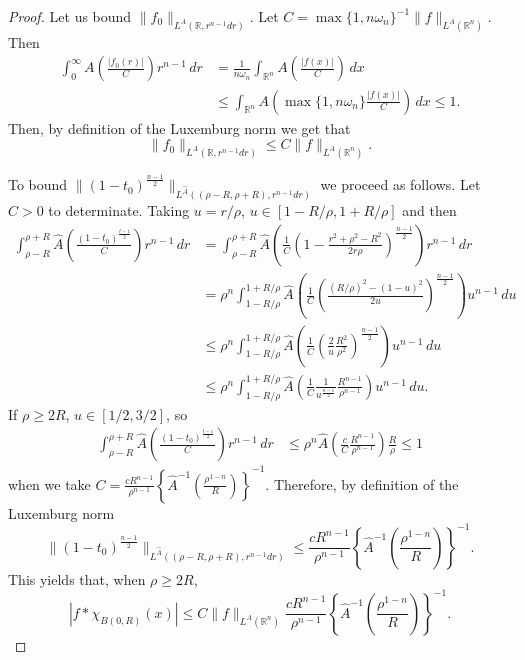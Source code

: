 \documentclass[leqno,twoside, 12pt]{amsart}
\theoremstyle{plain}
\numberwithin{equation}{section} \numberwithin{figure}{section}
\theoremstyle{definition}
\newcommand{\R}{\mathbb R}
\numberwithin{equation}{section}
\begin{document}
\begin{proof}
\noindent Let us bound $\|f_0\|_{L^A(\R, r^{n-1}dr)}$.
Let $C=\max\{1, n\omega_n\}^{-1}\|f\|_{L^A(\R^n)}$. Then
\begin{align*}
\int_0^\infty A\left( \frac{|f_0(r)|}{C} \right)r^{n-1}\,dr &=
\frac{1}{n\omega_n}\int_{\R^n} A\left( \frac{|f(x)|}{C} \right)\,dx\\
&\leq\int_{\R^n}
A\left(\max\{1, n\omega_n\}  \frac{|f(x)|}{C} \right)\,dx \leq 1.
\end{align*}
Then, by definition of the Luxemburg norm we get that
$$
\|f_0\|_{L^A(\R, r^{n-1}dr)}\leq C \|f\|_{L^A(\R^n)}.
$$


\noindent To bound  $\|(1-t_0)^\frac{n-1}{2}\|_{L^{\hat A}((\rho-R,\rho+R), r^{n-1}dr)}$ we proceed as follows. Let $C>0$ to determinate. Taking $u=r/\rho$, $u\in [1-R/\rho,1+R/\rho]$ and then
\begin{align*}
\int_{\rho-R}^{\rho+R}  \hat A\left(\frac{(1-t_0)^{\frac{t-1}{2}}}{C} \right)r^{n-1}\,dr 
&=
\int_{\rho-R}^{\rho+R}  \hat A\left(\frac{1}{C}\left(1-\frac{r^2 +   \rho^2 - R^2}{2r\rho}\right)^{\frac{n-1}{2}} \right)r^{n-1}\,dr\\
&=
\rho^n \int_{1-R/\rho}^{1+R/\rho}  \hat A\left( \frac{1}{C} \left(\frac{(R/\rho)^2 -(1-u)^2}{2u} \right)^\frac{n-1}{2}\right)u^{n-1}\,du\\
&\leq 
\rho^n \int_{1-R/\rho}^{1+R/\rho}  \hat A\left( \frac{1}{C}\left(\frac{2}{u} \frac{R^2}{\rho^2} \right)^\frac{n-1}{2}\right)u^{n-1}\,du\\
&\leq 
\rho^n \int_{1-R/\rho}^{1+R/\rho}  \hat A\left( \frac{1}{C} \frac{1}{u^\frac{n-1}{2}}\frac{R^{n-1}}{\rho^{n-1}} \right)u^{n-1}\,du.
\end{align*}
If $\rho\geq 2R$, $u\in[1/2,3/2]$, so
\begin{align*}
\int_{\rho-R}^{\rho+R}  \hat A\left(\frac{(1-t_0)^{\frac{t-1}{2}}}{C} \right)r^{n-1}\,dr 
&\leq
\rho^n  \hat A\left( \frac{c}{C} \frac{R^{n-1}}{\rho^{n-1}} \right) \frac{R}{\rho}\leq 1
\end{align*}
when we take $C= \frac{cR^{n-1}}{\rho^{n-1}} \left\{\hat A^{-1}\left( \frac{\rho^{1-n}}{R}\right) \right\}^{-1}$. Therefore, by definition of the Luxemburg norm
$$
\|(1-t_0)^\frac{n-1}{2}\|_{L^{\hat A}((\rho-R,\rho+R), r^{n-1}dr)} \leq  \frac{cR^{n-1}}{\rho^{n-1}} \left\{\hat A^{-1}\left( \frac{\rho^{1-n}}{R}\right) \right\}^{-1}.
$$
This yields that, when $\rho\geq 2R$,
\begin{equation} \label{f.1}
|f*\chi_{B(0,R)}(x)|\leq C \|f\|_{L^A(\R^n)}   \frac{cR^{n-1}}{\rho^{n-1}} \left\{\hat A^{-1}\left( \frac{\rho^{1-n}}{R}\right) \right\}^{-1}.
\end{equation}


\end{proof}
\end{document}
